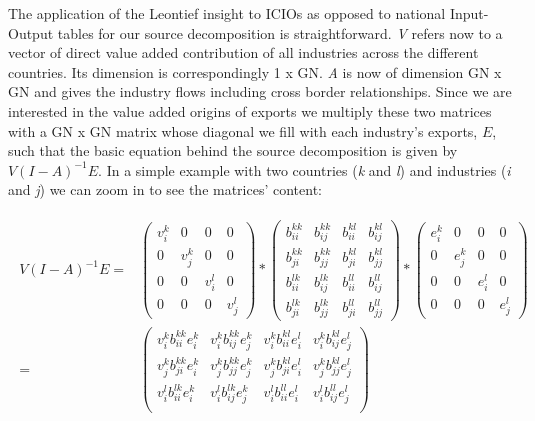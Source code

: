 \documentclass{article}\usepackage[]{graphicx}\usepackage[]{color}
\begin{document}
The application of the Leontief insight to ICIOs as opposed to national Input-Output tables for our source decomposition is straightforward. \textit{V} refers now to a vector of direct value added contribution of all industries across the different countries. Its dimension is correspondingly 1 x GN. \textit{A} is now of dimension GN x GN and gives the industry flows including cross border relationships. Since we are interested in the value added origins of exports we multiply these two matrices with a GN x GN matrix whose diagonal we fill with each industry's exports, $E$, such that the basic equation behind the source decomposition is given by $V(I-A)^{-1}E$. In a simple example with two countries (\textit{k} and \textit{l}) and industries (\textit{i} and \textit{j}) we can zoom in to see the matrices' content:

\begin{align}
\begin{split}
V (I-A)^{-1}E=&
\begin{pmatrix}
v_{i}^{k}& 0& 0& 0\\
0& v_{j}^{k}& 0& 0\\
0& 0& v_{i}^{l}& 0\\
0& 0& 0& v_{j}^{l}
\end{pmatrix}
*
\begin{pmatrix}
b_{ii}^{kk}& b_{ij}^{kk}& b_{ii}^{kl}& b_{ij}^{kl}\\
b_{ji}^{kk}& b_{jj}^{kk}& b_{ji}^{kl}& b_{jj}^{kl}\\
b_{ii}^{lk}& b_{ij}^{lk}& b_{ii}^{ll}& b_{ij}^{ll}\\
b_{ji}^{lk}& b_{jj}^{lk}& b_{ji}^{ll}& b_{jj}^{ll}
\end{pmatrix}
*
\begin{pmatrix}
e_{i}^{k}& 0& 0& 0\\
0& e_{j}^{k}& 0& 0\\
0& 0& e_{i}^{l}& 0\\
0& 0& 0& e_{j}^{l}
\end{pmatrix}
 \\
=& 
\begin{pmatrix}
v_{i}^{k}b_{ii}^{kk}e_{i}^{k}& v_{i}^{k} b_{ij}^{kk}e_{j}^{k}& v_{i}^{k}b_{ii}^{kl}e_{i}^{l}& v_{i}^{k}b_{ij}^{kl}e_{j}^{l}\\
v_{j}^{k}b_{ji}^{kk}e_{i}^{k}& v_{j}^{k}b_{jj}^{kk}e_{j}^{k}& v_{j}^{k}b_{ji}^{kl}e_{i}^{l}& v_{j}^{k}b_{jj}^{kl}e_{j}^{l}\\
v_{i}^{l}b_{ii}^{lk}e_{i}^{k}& v_{i}^{l}b_{ij}^{lk}e_{j}^{k}& v_{i}^{l}b_{ii}^{ll}e_{i}^{l}& v_{i}^{l}b_{ij}^{ll}e_{j}^{l}\\

\end{pmatrix}
\end{split}
\end{align}
\end{document}
